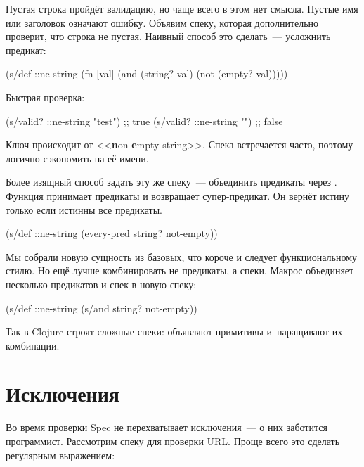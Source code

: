 Пустая строка пройдёт валидацию, но чаще всего в этом нет смысла. Пустые имя или
заголовок означают ошибку. Объявим спеку, которая дополнительно проверит, что
строка не пустая. Наивный способ это сделать~--- усложнить предикат:



\begin{clojure}
(s/def ::ne-string
  (fn [val]
    (and (string? val)
         (not (empty? val)))))
\end{clojure}


\noindent
Быстрая проверка:


\begin{clojure}
(s/valid? ::ne-string "test") ;; true
(s/valid? ::ne-string "")     ;; false
\end{clojure}


\label{ne-string}

Ключ  происходит от <<\textbf{n}on-\textbf{e}mpty
string>>. Спека встречается часто, поэтому логично сэкономить на её имени.

Более изящный способ задать эту же спеку~--- объединить предикаты через
. Функция принимает предикаты и возвращает супер-предикат. Он
вернёт истину только если истинны все предикаты.


\begin{clojure}
(s/def ::ne-string
  (every-pred string? not-empty))
\end{clojure}



Мы собрали новую сущность из базовых, что короче и следует функциональному
стилю. Но ещё лучше комбинировать не предикаты, а спеки. Макрос 
объединяет несколько предикатов и спек в новую спеку:


\begin{clojure}
(s/def ::ne-string
  (s/and string? not-empty))
\end{clojure}


Так в Clojure строят сложные спеки: объявляют примитивы и~наращивают их
комбинации.

\section{Исключения}


Во время проверки Spec не перехватывает исключения~--- о них заботится
программист. Рассмотрим спеку для проверки URL. Проще всего это сделать
регулярным выражением:

